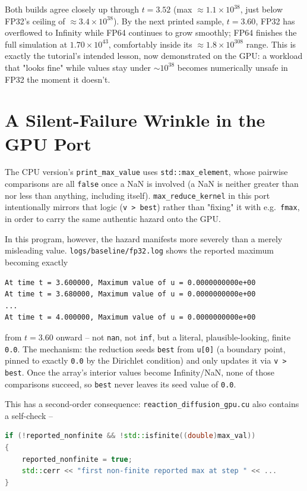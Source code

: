 \documentclass[11pt,a4paper]{article}
\begin{document}
Both builds agree closely up through $t=3.52$ (max $\approx1.1\times10^{38}$,
just below FP32's ceiling of $\approx3.4\times10^{38}$). By the next printed
sample, $t=3.60$, FP32 has overflowed to Infinity while FP64 continues to
grow smoothly; FP64 finishes the full simulation at $1.70\times10^{43}$,
comfortably inside its $\approx1.8\times10^{308}$ range. This is exactly the
tutorial's intended lesson, now demonstrated on the GPU: a workload that
"looks fine" while values stay under $\sim10^{38}$ becomes numerically
unsafe in FP32 the moment it doesn't.

\section{A Silent-Failure Wrinkle in the GPU Port}
\label{sec:silent-failure}

The CPU version's \texttt{print\_max\_value} uses \texttt{std::max\_element},
whose pairwise comparisons are all \texttt{false} once a NaN is involved (a
NaN is neither greater than nor less than anything, including itself).
\texttt{max\_reduce\_kernel} in this port intentionally mirrors that logic
(\texttt{v > best}) rather than "fixing" it with e.g.\ \texttt{fmax}, in
order to carry the same authentic hazard onto the GPU.

In this program, however, the hazard manifests more severely than a merely
misleading value. \texttt{logs/baseline/fp32.log} shows the reported
maximum becoming exactly

\begin{lstlisting}
At time t = 3.600000, Maximum value of u = 0.0000000000e+00
At time t = 3.680000, Maximum value of u = 0.0000000000e+00
...
At time t = 4.000000, Maximum value of u = 0.0000000000e+00
\end{lstlisting}

\noindent from $t=3.60$ onward -- not \texttt{nan}, not \texttt{inf}, but a
literal, plausible-looking, finite \texttt{0.0}. The mechanism: the
reduction seeds \texttt{best} from \texttt{u[0]} (a boundary point, pinned
to exactly \texttt{0.0} by the Dirichlet condition) and only updates it via
\texttt{v > best}. Once the array's interior values become
Infinity/NaN, none of those comparisons succeed, so \texttt{best} never
leaves its seed value of \texttt{0.0}.

This has a second-order consequence: \texttt{reaction\_diffusion\_gpu.cu}
also contains a self-check --

\begin{lstlisting}[language=C++]
if (!reported_nonfinite && !std::isfinite((double)max_val))
{
    reported_nonfinite = true;
    std::cerr << "first non-finite reported max at step " << ...
}
\end{lstlisting}
\end{document}
